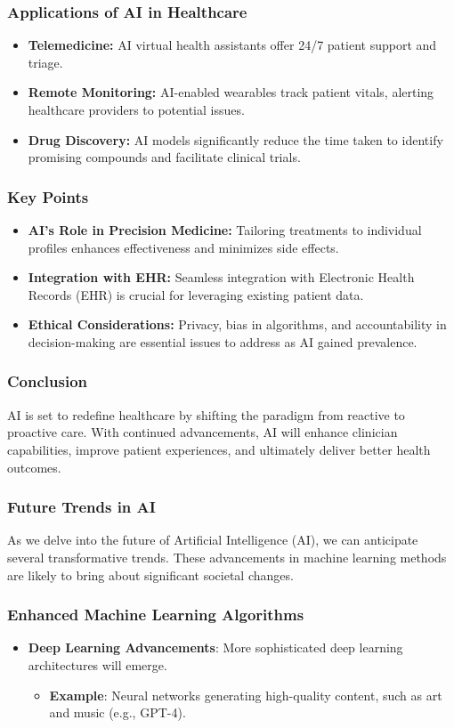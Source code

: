 \documentclass[aspectratio=169]{beamer}
\begin{document}
\begin{frame}[fragile]
    \frametitle{Applications of AI in Healthcare}
    \begin{itemize}
        \item \textbf{Telemedicine:} AI virtual health assistants offer 24/7 patient support and triage.
        \item \textbf{Remote Monitoring:} AI-enabled wearables track patient vitals, alerting healthcare providers to potential issues.
        \item \textbf{Drug Discovery:} AI models significantly reduce the time taken to identify promising compounds and facilitate clinical trials.
    \end{itemize}
\end{frame}

\begin{frame}[fragile]
    \frametitle{Key Points}
    \begin{itemize}
        \item \textbf{AI's Role in Precision Medicine:} Tailoring treatments to individual profiles enhances effectiveness and minimizes side effects.
        \item \textbf{Integration with EHR:} Seamless integration with Electronic Health Records (EHR) is crucial for leveraging existing patient data.
        \item \textbf{Ethical Considerations:} Privacy, bias in algorithms, and accountability in decision-making are essential issues to address as AI gained prevalence.
    \end{itemize}
\end{frame}

\begin{frame}[fragile]
    \frametitle{Conclusion}
    AI is set to redefine healthcare by shifting the paradigm from reactive to proactive care. With continued advancements, AI will enhance clinician capabilities, improve patient experiences, and ultimately deliver better health outcomes.
\end{frame}

\begin{frame}[fragile]
    \frametitle{Future Trends in AI}
    As we delve into the future of Artificial Intelligence (AI), we can anticipate several transformative trends. These advancements in machine learning methods are likely to bring about significant societal changes.
\end{frame}

\begin{frame}[fragile]
    \frametitle{Enhanced Machine Learning Algorithms}
    \begin{itemize}
        \item \textbf{Deep Learning Advancements}: More sophisticated deep learning architectures will emerge.
        \begin{itemize}
            \item \textbf{Example}: Neural networks generating high-quality content, such as art and music (e.g., GPT-4).
        \end{itemize}
    \end{itemize}
\end{frame}
\end{document}
